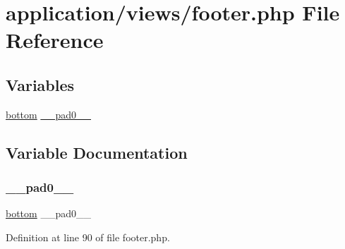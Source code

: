 \hypertarget{footer_8php}{}\section{application/views/footer.php File Reference}
\label{footer_8php}
\subsection*{Variables}
\begin{DoxyCompactItemize}
\item 
\mbox{\hyperlink{wsidebar_8php_a9034efd9266ed643f35aa86e8ca32ac2}{bottom}} \mbox{\hyperlink{footer_8php_abac8cb0f2f1a4fa3b65c118d9f1ae845}{\+\_\+\+\_\+pad0\+\_\+\+\_\+}}
\end{DoxyCompactItemize}


\subsection{Variable Documentation}
\mbox{\label{footer_8php_abac8cb0f2f1a4fa3b65c118d9f1ae845}} 
\subsubsection{\texorpdfstring{\_\_pad0\_\_}{\_\_pad0\_\_}}
{\footnotesize\ttfamily \mbox{\hyperlink{wsidebar_8php_a9034efd9266ed643f35aa86e8ca32ac2}{bottom}} \+\_\+\+\_\+pad0\+\_\+\+\_\+}



Definition at line 90 of file footer.\+php.


